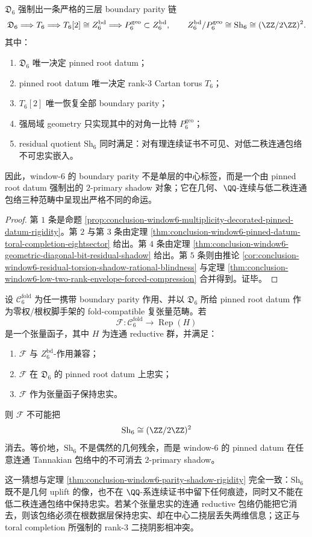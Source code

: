 \begin{theorem}\label{thm:conclusion-window6-parity-shadow-rigidity}
\(\mathfrak D_6\) 强制出一条严格的三层 boundary parity 链
\[
\mathfrak D_6
\Longrightarrow
T_6
\Longrightarrow
T_6[2]\cong Z_6^{\mathrm{bd}}
\Longrightarrow
P_6^{\mathrm{geo}}\subset Z_6^{\mathrm{bd}},
\qquad
Z_6^{\mathrm{bd}}/P_6^{\mathrm{geo}}\cong \mathrm{Sh}_6\cong (\ZZ/2\ZZ)^2.
\]
其中：
\begin{enumerate}
  \item \(\mathfrak D_6\) 唯一决定 pinned root datum；
  \item pinned root datum 唯一决定 rank-\(3\) Cartan torus \(T_6\)；
  \item \(T_6[2]\) 唯一恢复全部 boundary parity；
  \item 强局域 geometry 只实现其中的对角一比特 \(P_6^{\mathrm{geo}}\)；
  \item residual quotient \(\mathrm{Sh}_6\) 同时满足：对有理连续证书不可见、对低二秩连通包络不可忠实嵌入。
\end{enumerate}
因此，window-\(6\) 的 boundary parity 不是单层的中心标签，而是一个由 pinned root datum 强制出的 \(2\)-primary shadow 对象；它在几何、\(\QQ\)-连续与低二秩连通包络三种范畴中呈现出严格不同的命运。
\end{theorem}
\begin{proof}
第 \(1\) 条是命题 \ref{prop:conclusion-window6-multiplicity-decorated-pinned-datum-rigidity}。第 \(2\) 与第 \(3\) 条由定理 \ref{thm:conclusion-window6-pinned-datum-toral-completion-eightsector} 给出。第 \(4\) 条由定理 \ref{thm:conclusion-window6-geometric-diagonal-bit-residual-shadow} 给出。第 \(5\) 条则由推论 \ref{cor:conclusion-window6-residual-torsion-shadow-rational-blindness} 与定理 \ref{thm:conclusion-window6-low-two-rank-envelope-forced-compression} 合并得到。证毕。
\end{proof}

\begin{conjecture}\label{conj:conclusion-window6-tannakian-torsion-shadow-nonerasability}
设 \(\mathcal C_6^{\mathrm{fold}}\) 为任一携带 boundary parity 作用、并以 \(\mathfrak D_6\) 所给 pinned root datum 作为零权/根权脚手架的 fold-compatible 复张量范畴。若
\[
\mathcal F:\mathcal C_6^{\mathrm{fold}}\longrightarrow \operatorname{Rep}(H)
\]
是一个张量函子，其中 \(H\) 为连通 reductive 群，并满足：
\begin{enumerate}
  \item \(\mathcal F\) 与 \(Z_6^{\mathrm{bd}}\)-作用兼容；
  \item \(\mathcal F\) 在 \(\mathfrak D_6\) 的 pinned root datum 上忠实；
  \item \(\mathcal F\) 作为张量函子保持忠实。
\end{enumerate}
则 \(\mathcal F\) 不可能把
\[
\mathrm{Sh}_6\cong (\ZZ/2\ZZ)^2
\]
消去。等价地，\(\mathrm{Sh}_6\) 不是偶然的几何残余，而是 window-\(6\) 的 pinned datum 在任意连通 Tannakian 包络中的不可消去 \(2\)-primary shadow。
\end{conjecture}

这一猜想与定理 \ref{thm:conclusion-window6-parity-shadow-rigidity} 完全一致：\(\mathrm{Sh}_6\) 既不是几何 uplift 的像，也不在 \(\QQ\)-系连续证书中留下任何痕迹，同时又不能在低二秩连通包络中保持忠实。若某个张量忠实的连通 reductive 包络仍能把它消去，则该包络必须在根数据层保持忠实、却在中心二挠层丢失两维信息；这正与 toral completion 所强制的 rank-\(3\) 二挠阴影相冲突。
